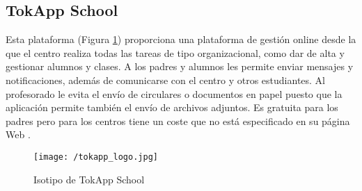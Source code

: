 \subsection{TokApp School}
Esta plataforma (Figura \ref{fig:tokapp}) proporciona una plataforma de gestión online desde la que el centro realiza todas las tareas de tipo organizacional, como dar de alta y gestionar alumnos y clases. A los padres y alumnos les permite enviar mensajes y notificaciones, además de comunicarse con el centro y otros estudiantes. Al profesorado le evita el envío de circulares o documentos en papel puesto que la aplicación permite también el envío de archivos adjuntos. Es gratuita para los padres pero para los centros tiene un coste que no está especificado en su página Web \cite{Educo2016}.

\begin{figure}[!h]
	\begin{center}
		\texttt{[image: /tokapp\_logo.jpg]}
		\caption{Isotipo de TokApp School}
		\label{fig:tokapp}
	\end{center}
\end{figure}

